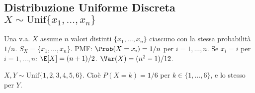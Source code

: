 \subsection{Distribuzione Uniforme Discreta \texorpdfstring{$X \sim \text{Unif}\{x_1, \dots, x_n\}$}{X ~ Unif}}
Una v.a. $X$ assume $n$ valori distinti $\{x_1, \dots, x_n\}$ ciascuno con la stessa probabilità $1/n$.
$S_X = \{x_1, \dots, x_n\}$.
PMF: $\Prob(X=x_i) = 1/n$ per $i=1, \dots, n$.
Se $x_i = i$ per $i=1, \dots, n$:
$\E[X] = (n+1)/2$.
$\Var(X) = (n^2-1)/12$.
\begin{example}
$X, Y \sim \text{Unif}\{1, 2, 3, 4, 5, 6\}$. Cioè $P(X=k)=1/6$ per $k \in \{1, ..., 6\}$, e lo stesso per $Y$.
\end{example}

